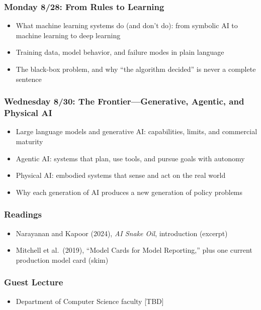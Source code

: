 \documentclass[12pt]{article}
\begin{document}
    \subsubsection*{Monday 8/28: From Rules to Learning}
        \begin{itemize}
            \item What machine learning systems do (and don't do): from symbolic AI to machine learning to deep learning
            \item Training data, model behavior, and failure modes in plain language
            \item The black-box problem, and why ``the algorithm decided'' is never a complete sentence
        \end{itemize}
    \subsubsection*{Wednesday 8/30: The Frontier---Generative, Agentic, and Physical AI}
        \begin{itemize}
            \item Large language models and generative AI: capabilities, limits, and commercial maturity
            \item Agentic AI: systems that plan, use tools, and pursue goals with autonomy
            \item Physical AI: embodied systems that sense and act on the real world
            \item Why each generation of AI produces a new generation of policy problems
        \end{itemize}
    \subsubsection*{Readings}
        \begin{itemize}
            \item Narayanan and Kapoor (2024), \emph{AI Snake Oil}, introduction (excerpt)
            \item Mitchell et al.\ (2019), ``Model Cards for Model Reporting,'' plus one current production model card (skim)
        \end{itemize}
    \subsubsection*{Guest Lecture}
        \begin{itemize}
            \item Department of Computer Science faculty [TBD]
        \end{itemize}
\end{document}
